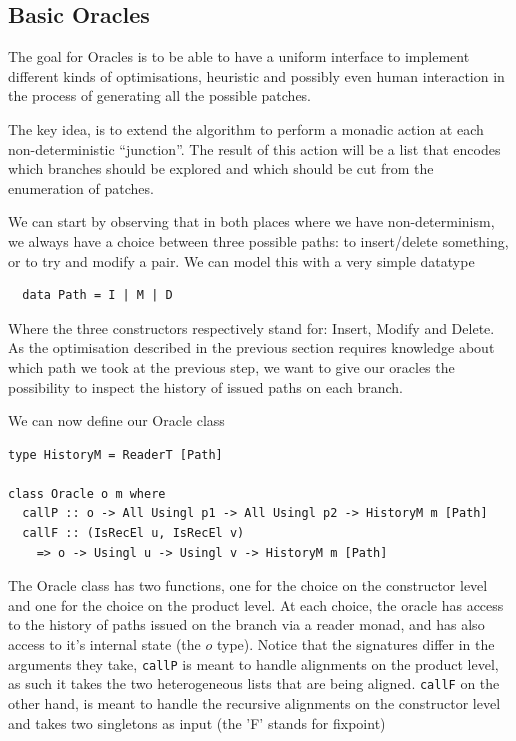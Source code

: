 \documentclass[11pt, titlepage]{article}
\newcommand{\toHaskell}[1]{\texttt{#1}\xspace}
\begin{document}
\subsection{Basic Oracles}\label{oracles}
The goal for Oracles is to be able to have a uniform interface to implement 
different kinds of optimisations, heuristic and possibly even human interaction in the process of generating all the possible patches.
 
The key idea, is to extend the algorithm to perform a monadic action at each non-deterministic ``junction''. The result of this action will be a list that encodes which branches should be explored and which should be cut from the enumeration of patches.

We can start by observing that in both places where we have non-determinism, we always have a choice between three possible paths: to insert/delete something, or to try and 
modify a pair. We can model this with a very simple datatype

\begin{verbatim}
  data Path = I | M | D 
\end{verbatim}

Where the three constructors respectively stand for: Insert, Modify and Delete.
As the optimisation described in the previous section requires knowledge about 
which path we took at the previous step, we want to give our oracles the 
possibility to inspect the history of issued paths on each branch.

We can now define our Oracle class

\begin{verbatim}
type HistoryM = ReaderT [Path]

class Oracle o m where
  callP :: o -> All Usingl p1 -> All Usingl p2 -> HistoryM m [Path]
  callF :: (IsRecEl u, IsRecEl v) 
  	=> o -> Usingl u -> Usingl v -> HistoryM m [Path]
\end{verbatim}

The Oracle class has two functions, one for the choice on the constructor level 
and one for the choice on the product level. At each choice, the oracle has 
access to the history of paths issued on the branch via a reader monad, and 
has also access to it's internal state (the $o$ type). Notice that the signatures differ in the arguments they take, \toHaskell{callP} is meant to handle alignments on the product level, as such it takes the two heterogeneous lists that are being aligned. \toHaskell{callF} on the other hand, is meant to handle the recursive alignments on the constructor level and takes two singletons as input (the 'F' stands for fixpoint)
 
\end{document}
